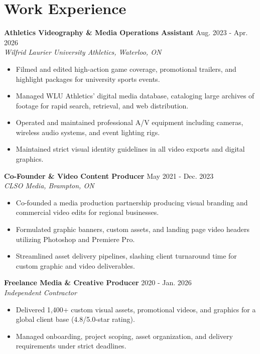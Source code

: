 \documentclass[a4paper,10pt]{article}
\begin{document}
\section*{Work Experience}
\textbf{Athletics Videography & Media Operations Assistant} \hfill Aug. 2023 - Apr. 2026 \\
\textit{Wilfrid Laurier University Athletics, Waterloo, ON}
\begin{itemize}
    \item Filmed and edited high-action game coverage, promotional trailers, and highlight packages for university sports events.
    \item Managed WLU Athletics' digital media database, cataloging large archives of footage for rapid search, retrieval, and web distribution.
    \item Operated and maintained professional A/V equipment including cameras, wireless audio systems, and event lighting rigs.
    \item Maintained strict visual identity guidelines in all video exports and digital graphics.
\end{itemize}

\vspace{3pt}
\textbf{Co-Founder & Video Content Producer} \hfill May 2021 - Dec. 2023 \\
\textit{CLSO Media, Brampton, ON}
\begin{itemize}
    \item Co-founded a media production partnership producing visual branding and commercial video edits for regional businesses.
    \item Formulated graphic banners, custom assets, and landing page video headers utilizing Photoshop and Premiere Pro.
    \item Streamlined asset delivery pipelines, slashing client turnaround time for custom graphic and video deliverables.
\end{itemize}

\vspace{3pt}
\textbf{Freelance Media & Creative Producer} \hfill 2020 - Jan. 2026 \\
\textit{Independent Contractor}
\begin{itemize}
    \item Delivered 1,400+ custom visual assets, promotional videos, and graphics for a global client base (4.8/5.0-star rating).
    \item Managed onboarding, project scoping, asset organization, and delivery requirements under strict deadlines.
\end{itemize}
\end{document}
